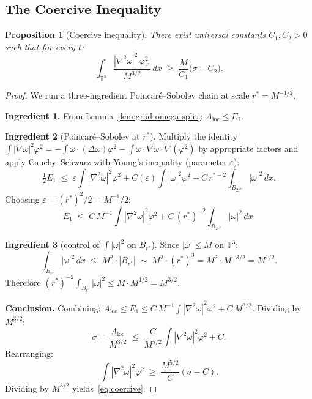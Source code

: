 \documentclass[11pt]{article}
\newtheorem{proposition}[theorem]{Proposition}
\theoremstyle{definition}
\theoremstyle{remark}
\newcommand{\T}{\mathbb{T}}
\begin{document}
\subsection{The Coercive Inequality}

\begin{proposition}[Coercive inequality]\label{prop:coercive}
  There exist universal constants $C_1,C_2>0$ such that for every $t$:
  \begin{equation}\label{eq:coercive}
    \int_{\T^3}\frac{|\nabla^2\omega|^2\,\varphi_{r^*}^2}{M^{3/2}}\,dx
    \;\geq\;
    \frac{M}{C_1}\bigl(\sigma - C_2\bigr).
  \end{equation}
\end{proposition}
\begin{proof}
  We run a three-ingredient Poincaré--Sobolev chain at scale $r^*=M^{-1/2}$.

  \smallskip\noindent\textbf{Ingredient 1.}
  From Lemma~\ref{lem:grad-omega-split}: $A_{\mathrm{loc}}\leq E_1$.

  \smallskip\noindent\textbf{Ingredient 2} (Poincaré--Sobolev at $r^*$).
  Multiply the identity $\int|\nabla\omega|^2\varphi^2 = -\int\omega\cdot(\Delta\omega)\varphi^2
  - \int\omega\cdot\nabla\omega\cdot\nabla(\varphi^2)$ by appropriate factors
  and apply Cauchy--Schwarz with Young's inequality (parameter $\varepsilon$):
  \[
    \tfrac{1}{2}E_1 \;\leq\;
    \varepsilon\int|\nabla^2\omega|^2\varphi^2 + C(\varepsilon)\int|\omega|^2\varphi^2
    + C\,r^{*-2}\int_{B_{2r^*}}|\omega|^2\,dx.
  \]
  Choosing $\varepsilon = (r^*)^2/2 = M^{-1}/2$:
  \[
    E_1 \;\leq\; C\,M^{-1}\int|\nabla^2\omega|^2\varphi^2
         + C\,(r^*)^{-2}\int_{B_{2r^*}}|\omega|^2\,dx.
  \]

  \smallskip\noindent\textbf{Ingredient 3} (control of $\int|\omega|^2$ on $B_{r^*}$).
  Since $|\omega|\leq M$ on $\T^3$:
  \[
    \int_{B_{r^*}}|\omega|^2\,dx \;\leq\; M^2\cdot|B_{r^*}|
    \;\sim\; M^2\cdot(r^*)^3 = M^2\cdot M^{-3/2} = M^{1/2}.
  \]
  Therefore $(r^*)^{-2}\int_{B_{r^*}}|\omega|^2\leq M\cdot M^{1/2} = M^{3/2}$.

  \smallskip\noindent\textbf{Conclusion.}
  Combining: $A_{\mathrm{loc}}\leq E_1\leq C\,M^{-1}\int|\nabla^2\omega|^2\varphi^2
  + C\,M^{3/2}$.  Dividing by $M^{3/2}$:
  \[
    \sigma = \frac{A_{\mathrm{loc}}}{M^{3/2}}
    \;\leq\; \frac{C}{M^{5/2}}\int|\nabla^2\omega|^2\varphi^2 + C.
  \]
  Rearranging:
  \[
    \int|\nabla^2\omega|^2\varphi^2 \;\geq\; \frac{M^{5/2}}{C}(\sigma - C).
  \]
  Dividing by $M^{3/2}$ yields~\eqref{eq:coercive}.
\end{proof}
\end{document}
